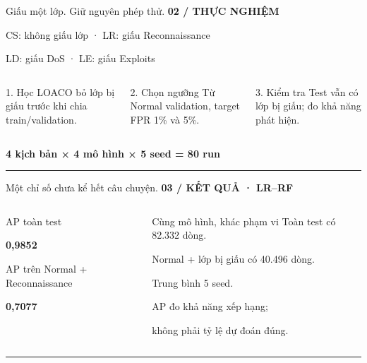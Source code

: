 \documentclass[17pt,aspectratio=169]{beamer}
\newcommand{\eyebrow}[1]{{\small\color{green}\bfseries #1}\par\vspace{2mm}}
\newcommand{\takeaway}[1]{\vfill{\color{green}\rule{\linewidth}{.5pt}}\par\vspace{1mm}{\small #1}}
\begin{document}
\begin{frame}{Giấu một lớp. Giữ nguyên phép thử.}
\eyebrow{02 / THỰC NGHIỆM}
{\small CS: không giấu lớp · LR: giấu Reconnaissance\par LD: giấu DoS · LE: giấu Exploits}\par\vspace{3mm}
\begin{columns}[T,onlytextwidth]
\begin{column}{.31\textwidth}\begin{block}{1. Học}
LOACO bỏ lớp bị giấu trước khi chia train/validation.
\end{block}\end{column}
\begin{column}{.31\textwidth}\begin{block}{2. Chọn ngưỡng}
Từ Normal validation, target FPR 1\% và 5\%.
\end{block}\end{column}
\begin{column}{.31\textwidth}\begin{block}{3. Kiểm tra}
Test vẫn có lớp bị giấu; đo khả năng phát hiện.
\end{block}\end{column}
\end{columns}
\vspace{3mm}
{\Large\bfseries 4 kịch bản × 4 mô hình × 5 seed = 80 run}
\takeaway{RF/XGB học có giám sát; IF/AE học trên Normal. Test không dùng để fit hoặc chọn ngưỡng.}
\end{frame}

\begin{frame}{Một chỉ số chưa kể hết câu chuyện.}
\eyebrow{03 / KẾT QUẢ · LR–RF}
\begin{columns}[T,onlytextwidth]
\begin{column}{.48\textwidth}
{\small AP toàn test}\par
{\Huge\bfseries 0,9852}\par\vspace{5mm}
{\small AP trên Normal + Reconnaissance}\par
{\Huge\bfseries\color{rust}0,7077}
\end{column}
\begin{column}{.48\textwidth}
\begin{block}{Cùng mô hình, khác phạm vi}
Toàn test có 82.332 dòng.\par\vspace{2mm}
Normal + lớp bị giấu có 40.496 dòng.
\end{block}
{\small Trung bình 5 seed.\par AP đo khả năng xếp hạng;\par không phải tỷ lệ dự đoán đúng.}
\end{column}
\end{columns}
\takeaway{Đọc AP cùng UADR, FPR, ngưỡng và số mẫu; khác phạm vi/prevalence làm thay đổi cách hiểu.}
\end{frame}
\end{document}
